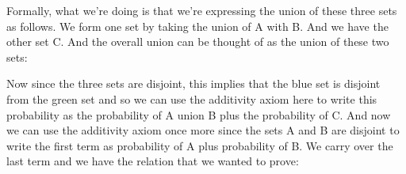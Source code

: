 \documentclass[pdftex, brazil, 12pt, twoside]{article}
\begin{document}
\begin{figure}[H]
  \begin{center}
  \end{center}
\end{figure}

Formally, what we're doing is that we're expressing the
union of these three sets as follows.
We form one set by taking the union of A with B. And we have
the other set C. And the overall union can be thought
of as the union of these two sets:

\begin{figure}[H]
  \begin{center}
  \end{center}
\end{figure}

Now since the three sets are disjoint, this implies that
the blue set is disjoint from the green set and so we can
use the additivity axiom here to write this probability as
the probability of A union B plus the probability of C. And
now we can use the additivity axiom once more since the sets
A and B are disjoint to write the first term as probability
of A plus probability of B. We carry over the last term and
we have the relation that we wanted to prove:

\begin{figure}[H]
  \begin{center}
  \end{center}
\end{figure}
\end{document}
